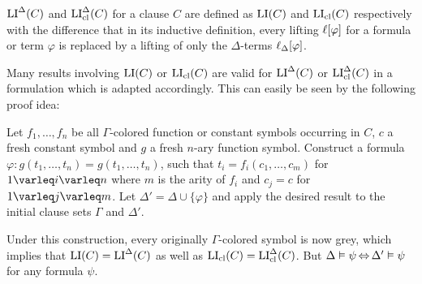 \documentclass[,%
	draft=false,%
	numbers=noendperiod
	11pt,
	a4paper,
	oneside,%
	openany,
]{memoir}
\begin{document}
\begin{defi}
	$\operatorname{LI}^\Delta(C)$ and $\operatorname{LI}_{\operatorname{cl}}^\Delta(C)$ for a clause $C$ are defined as $\operatorname{LI}(C)$ and $\operatorname{LI}_{\operatorname{cl}}(C)$ respectively with the difference that in its inductive definition, every lifting $\ell[\varphi]$ for a formula or term $\varphi$ is replaced by a lifting of only the $\Delta$-terms $\ell_{\Delta}[\varphi]$.
\end{defi}

\begin{remark}
	Many results involving $\operatorname{LI}(C)$ or $\operatorname{LI}_{\operatorname{cl}}(C)$ are valid for $\operatorname{LI}^\Delta(C)$ or $\operatorname{LI}_{\operatorname{cl}}^\Delta(C)$
	in a formulation which is adapted accordingly.
	This can easily be seen by the following proof idea:

	Let $f_1, \dots, f_n$ be all $\Gamma$-colored function or constant symbols occurring in $C$,
	$c$ a fresh constant symbol and $g$ a fresh $n$-ary function symbol.
	Construct a formula $\varphi:  g(t_1, \dots, t_n) = g(t_1, \dots, t_n)$,
	such that $t_i = f_i(c_1, \dots, c_m)$ for $1\varleq i \varleq n$ where $m$ is the arity of $f_i$ and $c_j = c$ for $1\varleq j \varleq m$. Let $\Delta' = \Delta \cup \{\varphi\}$ and apply the desired result to the initial clause sets $\Gamma$ and $\Delta'$.

	Under this construction, every originally $\Gamma$-colored symbol is now grey, which implies that $\operatorname{LI}(C) = \operatorname{LI}^\Delta(C)$ as well as $\operatorname{LI}_{\operatorname{cl}}(C) = \operatorname{LI}_{\operatorname{cl}}^\Delta(C)$.
	But $\Delta\vDash \psi \operatorname{\Leftrightarrow} \Delta'\vDash \psi$ for any formula $\psi$.
\end{remark}
\end{document}
